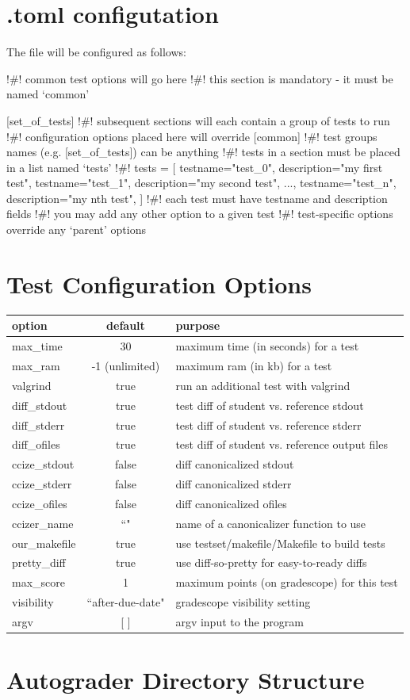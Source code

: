 \documentclass[11pt]{report}
\begin{document}
\section*{.toml configutation}
The  file will be configured as follows:
\begin{bashcodeblock}
[common]
!\#! common test options will go here
!\#! this section is mandatory - it must be named `common' 

[set_of_tests] 
!\#! subsequent sections will each contain a group of tests to run
!\#! configuration options placed here will override [common]
!\#! test groups names (e.g. [set_of_tests]) can be anything
!\#! tests in a section must be placed in a list named `tests'
!\#! tests = [
      {testname="test_0", description="my first test"},
      {testname="test_1", description="my second test"},
      ..., 
      {testname="test_n", description="my nth test"},
]
!\#! each test must have testname and description fields
!\#! you may add any other option to a given test
!\#! test-specific options override any `parent' options
\end{bashcodeblock}

\section*{Test Configuration Options}
\begin{tabular}{ | l | c | l | }
\hline			
\textbf{option} & \textbf{default} & \textbf{purpose} \\ \hline\hline
max\_time & 30 & maximum time (in seconds) for a test \\\hline
max\_ram & -1 (unlimited) & maximum ram (in kb) for a test \\\hline
valgrind & true & run an additional test with valgrind \\\hline
diff\_stdout & true & test diff of student vs. reference stdout \\\hline
diff\_stderr & true & test diff of student vs. reference stderr \\\hline
diff\_ofiles & true & test diff of student vs. reference output files \\\hline
ccize\_stdout & false & diff canonicalized stdout \\\hline
ccize\_stderr & false & diff canonicalized stderr \\\hline
ccize\_ofiles & false & diff canonicalized ofiles \\\hline
ccizer\_name & ``" & name of a canonicalizer function to use \\\hline
our\_makefile & true & use testset/makefile/Makefile to build tests \\\hline
pretty\_diff & true & use diff-so-pretty for easy-to-ready diffs \\\hline
max\_score & 1 & maximum points (on gradescope) for this test \\\hline
visibility &``after-due-date" & gradescope visibility setting \\\hline
argv & [ ] & argv input to the program \\\hline
\end{tabular}

\section*{Autograder Directory Structure}
\begin{bashcodeblock}

\end{bashcodeblock}
\end{document}
